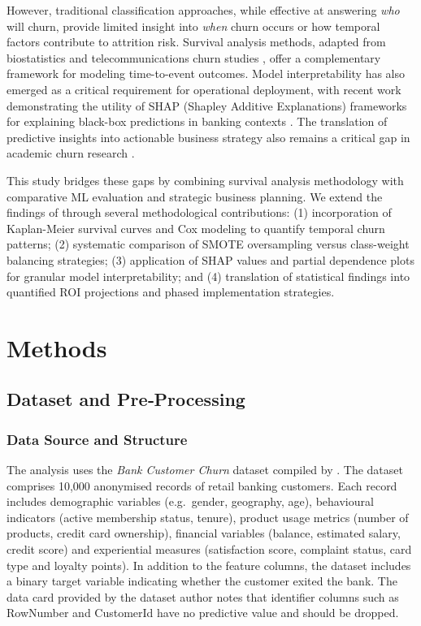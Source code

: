 \documentclass[12pt]{article}
\begin{document}
However, traditional classification approaches, while effective at answering \emph{who} will churn, provide limited insight into \emph{when} churn occurs or how temporal factors contribute to attrition risk. Survival analysis methods, adapted from biostatistics and telecommunications churn studies \citep{desai_customer_survival}, offer a complementary framework for modeling time-to-event outcomes. Model interpretability has also emerged as a critical requirement for operational deployment, with recent work demonstrating the utility of SHAP (Shapley Additive Explanations) frameworks for explaining black-box predictions in banking contexts \citep{peng2023interpretability}. The translation of predictive insights into actionable business strategy also remains a critical gap in academic churn research \citep{brito2024framework}.

This study bridges these gaps by combining survival analysis methodology with comparative ML evaluation and strategic business planning. We extend the findings of \citet{singh2024productchurn} through several methodological contributions: (1) incorporation of Kaplan-Meier survival curves and Cox modeling to quantify temporal churn patterns; (2) systematic comparison of SMOTE oversampling versus class-weight balancing strategies; (3) application of SHAP values and partial dependence plots for granular model interpretability; and (4) translation of statistical findings into quantified ROI projections and phased implementation strategies.

\section{Methods}
\subsection{Dataset and Pre‑Processing}
\subsubsection{Data Source and Structure}
The analysis uses the \emph{Bank Customer Churn} dataset compiled by \citet{kollipara2022bank}.  The dataset comprises 10,000 anonymised records of retail banking customers.  Each record includes demographic variables (e.g.\ gender, geography, age), behavioural indicators (active membership status, tenure), product usage metrics (number of products, credit card ownership), financial variables (balance, estimated salary, credit score) and experiential measures (satisfaction score, complaint status, card type and loyalty points).  In addition to the feature columns, the dataset includes a binary target variable indicating whether the customer exited the bank.  The data card provided by the dataset author notes that identifier columns such as RowNumber and CustomerId have no predictive value and should be dropped.
\end{document}
